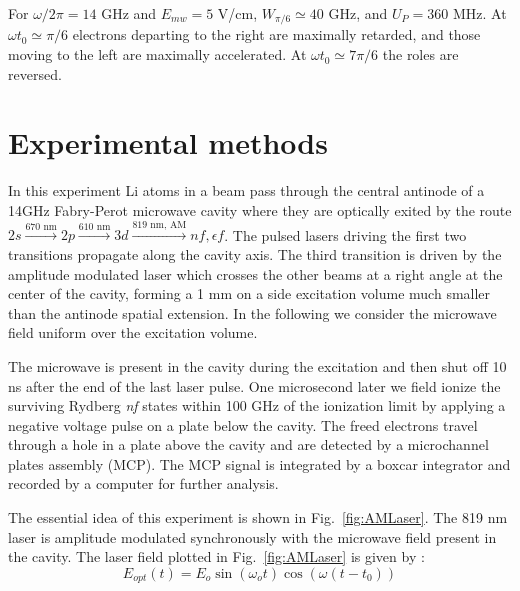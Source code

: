 \documentclass[pra, reprint]{revtex4-1}
\begin{document}
For $\omega/2\pi=14$ GHz and $E_{mw}=5$ V/cm, $W_{\pi/6} \simeq 40$ GHz, and $U_P=360$ MHz. At $\omega t_0 \simeq \pi/6$ electrons departing to the right are maximally retarded, and those moving to the left are maximally accelerated. At $\omega t_0 \simeq 7\pi/6$ the roles are reversed.

\section{Experimental methods}


In this experiment Li atoms in a beam pass through the central antinode of a 14GHz Fabry-Perot microwave cavity where they are optically exited by the route $ 2s \xrightarrow{\text{670 nm}} 2p \xrightarrow{\text{610 nm}} 3d  \xrightarrow{\text{819 nm, AM}} nf, \epsilon f$. The pulsed lasers driving the first two transitions propagate along the cavity axis. The third transition is driven by the amplitude modulated laser which crosses the other beams at a right angle at the center of the cavity, forming a 1 mm on a side excitation volume much smaller than the antinode spatial extension. In the following we consider the microwave field uniform over the excitation volume.

The microwave is present in the cavity during the excitation and then shut off 10 ns after the end of the last laser pulse. One microsecond later we field ionize the surviving Rydberg \emph{nf} states within 100 GHz of the ionization limit by applying a negative voltage pulse on a plate below the cavity. The freed electrons travel through a hole in a plate above the cavity and are detected by a microchannel plates assembly (MCP). The MCP signal is integrated by a boxcar integrator and recorded by a computer for further analysis.

The essential idea of this experiment is shown in Fig.~\ref{fig:AMLaser}. The 819 nm laser is amplitude modulated synchronously with the microwave field present in the cavity. The laser field plotted in Fig.~\ref{fig:AMLaser} is given by :
\begin{equation}
  \label{eq:Eopt}
  E_{opt}(t)=E_o \sin \left( \omega_o t\right) \cos \left( \omega (t-t_0) \right)
\end{equation}
\end{document}
